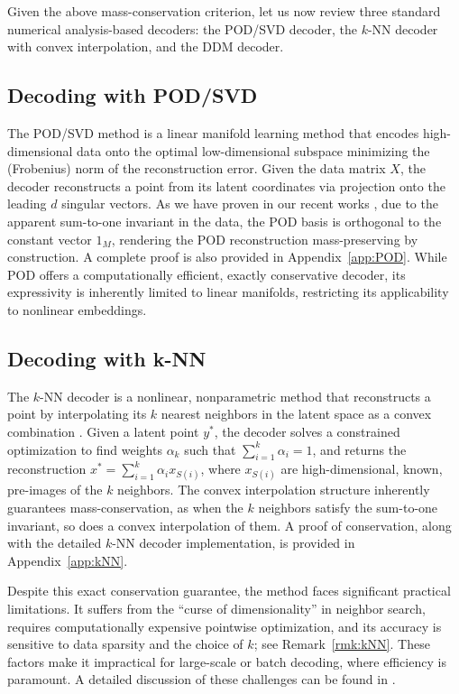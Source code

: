 \documentclass{article}
\begin{document}
Given the above mass-conservation criterion, let us now review three standard numerical analysis-based decoders: the POD/SVD decoder, the $k$-NN decoder with convex interpolation, and the DDM decoder.

\subsection{Decoding with POD/SVD}
The POD/SVD method \cite{deane1991low,graham1996alternative,shvartsman1998nonlinear,rowley2004model,sirisup2005stability} is a linear manifold learning method that encodes high-dimensional data onto the optimal low-dimensional subspace minimizing the (Frobenius) norm of the reconstruction error. Given the data matrix $X$, the decoder reconstructs a point from its latent coordinates via projection onto the leading $d$ singular vectors. As we have proven in our recent works \cite{alvarez2025next,viola2025pde}, due to the apparent sum-to-one invariant in the data, the POD basis is orthogonal to the constant vector $1_M$, rendering the POD reconstruction mass-preserving by construction. A complete proof is also provided in Appendix~\ref{app:POD}. While POD offers a computationally efficient, exactly conservative decoder, its expressivity is inherently limited to linear manifolds, restricting its applicability to nonlinear embeddings.     

\subsection{Decoding with k-NN}
The $k$-NN decoder is a nonlinear, nonparametric method that reconstructs a point by interpolating its $k$ nearest neighbors in the latent space as a convex combination \cite{fix1985discriminatory}. Given a latent point $y^*$, the decoder solves a constrained optimization to find weights $\alpha_k$ such that $\sum_{i=1}^k\alpha_i=1$, and returns the reconstruction $x^*=\sum_{i=1}^k \alpha_i x_{S(i)}$, where $x_{S(i)}$ are high-dimensional, known, pre-images of the $k$ neighbors. The convex interpolation structure inherently guarantees mass-conservation, as when the $k$ neighbors satisfy the sum-to-one invariant, so does a convex interpolation of them. A proof of conservation, along with the detailed $k$-NN decoder implementation, is provided in Appendix~\ref{app:kNN}.

Despite this exact conservation guarantee, the method faces significant practical limitations. It suffers from the ``curse of dimensionality'' in neighbor search, requires computationally expensive pointwise optimization, and its accuracy is sensitive to data sparsity and the choice of $k$; see Remark~\ref{rmk:kNN}. These factors make it impractical for large-scale or batch decoding, where efficiency is paramount. A detailed discussion of these challenges can be found in \cite{halder2024enhancing}.
\end{document}
